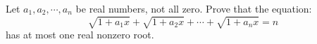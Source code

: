 Let $a_1,a_2,\cdots ,a_n$ be real numbers, not all zero. Prove that the equation:
\[\sqrt{1+a_1x}+\sqrt{1+a_2x}+\cdots +\sqrt{1+a_nx}=n\]
has at most one real nonzero root.